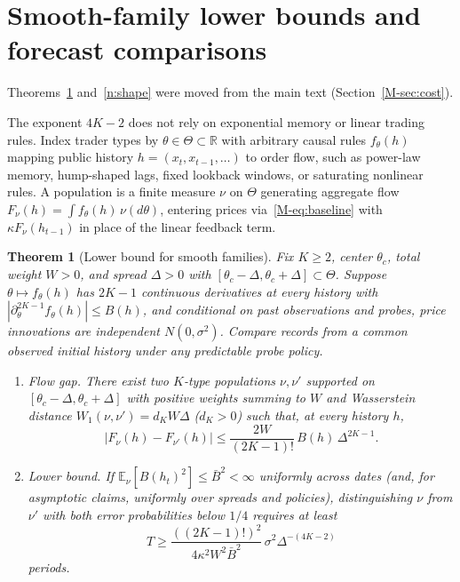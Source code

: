 \documentclass[12pt]{article}
\newtheorem{theorem}{Theorem}[section]
\theoremstyle{definition}
\theoremstyle{remark}
\newcommand{\E}{\mathbb{E}}
\newcommand{\R}{\mathbb{R}}
\begin{document}
\section{Smooth-family lower bounds and forecast comparisons}\label{app:univirr}

\noindent Theorems~\ref{n:univ} and~\ref{n:shape} were moved from the main text (Section~\ref{M-sec:cost}).


The exponent $4K-2$ does not rely on exponential memory or linear trading rules. Index trader types by $\theta \in \Theta \subset \R$ with arbitrary causal rules $f_\theta(h)$ mapping public history $h = (x_t, x_{t-1}, \dots)$ to order flow, such as power-law memory, hump-shaped lags, fixed lookback windows, or saturating nonlinear rules. A population is a finite measure $\nu$ on $\Theta$ generating aggregate flow $F_\nu(h) = \int f_\theta(h)\, \nu(d\theta)$, entering prices via~\eqref{M-eq:baseline} with $\kappa F_\nu(h_{t-1})$ in place of the linear feedback term.

\begin{theorem}[Lower bound for smooth families]\label{n:univ}
Fix $K \ge 2$, center $\theta_c$, total weight $W > 0$, and spread $\Delta > 0$ with $[\theta_c - \Delta, \theta_c + \Delta] \subset \Theta$. Suppose $\theta \mapsto f_\theta(h)$ has $2K-1$ continuous derivatives at every history with $|\partial_\theta^{2K-1} f_\theta(h)| \le B(h)$, and conditional on past observations and probes, price innovations are independent $N(0, \sigma^2)$. Compare records from a common observed initial history under any predictable probe policy.
\begin{enumerate}
  \item[(i)] \emph{Flow gap.} There exist two $K$-type populations $\nu, \nu'$ supported on $[\theta_c - \Delta, \theta_c + \Delta]$ with positive weights summing to $W$ and Wasserstein distance $W_1(\nu, \nu') = d_K W \Delta$ ($d_K > 0$) such that, at every history $h$,
  \[
    |F_\nu(h) - F_{\nu'}(h)| \le \frac{2W}{(2K-1)!}\, B(h)\, \Delta^{2K-1}.
  \]
  \item[(ii)] \emph{Lower bound.} If $\E_\nu[B(h_t)^2] \le \bar{B}^2 < \infty$ uniformly across dates (and, for asymptotic claims, uniformly over spreads and policies), distinguishing $\nu$ from $\nu'$ with both error probabilities below $1/4$ requires at least
  \[
    T \ge \frac{((2K-1)!)^2}{4 \kappa^2 W^2 \bar{B}^2}\, \sigma^2 \Delta^{-(4K-2)}
  \]
  periods.
\end{enumerate}
\end{theorem}
\end{document}
